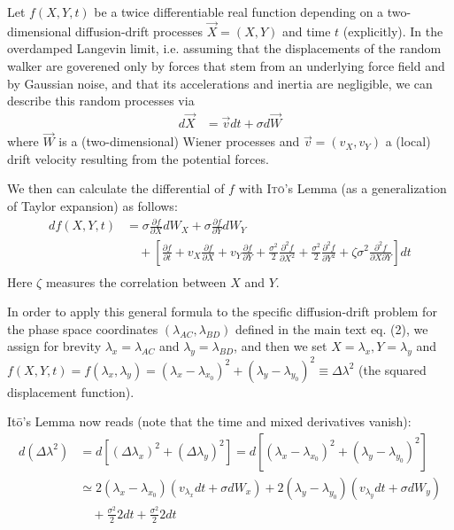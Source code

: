 \documentclass[10pt]{article}
\newcommand{\vekA}[1]{\vec{#1}}
\newcommand{\nn}{\nonumber}
\begin{document}
Let $f(X,Y,t)$ be a twice differentiable real function depending on a two-dimensional diffusion-drift processes $\vekA X=(X,Y)$ and time $t$ (explicitly).
In the overdamped Langevin limit, i.e. assuming that the displacements of the random walker are goverened only
by forces that stem from an underlying force field and by Gaussian noise, and that its accelerations and inertia are negligible,
we can describe this random processes via
\begin{align}
d\vekA X & = \vekA v dt + \sigma d\vekA W
\end{align}
where $\vekA W$ is a (two-dimensional) Wiener processes and $\vekA v = (v_X, v_Y)$ a (local) drift velocity resulting from the potential forces.

\pagebreak
\noindent We then can calculate the differential of $f$ with \textsc{It\={o}}'s Lemma (as a generalization of Taylor expansion) as follows:
\newcommand{\pder}[2]{\frac{\partial #1}{\partial #2}}
\newcommand{\pderII}[2]{\frac{\partial^2 #1}{\partial #2^2}}
\begin{align}
 df(X,Y,t) & = \sigma \pder{f}{X} dW_X + \sigma \pder{f}{Y} dW_Y  \nn\\
	   & \quad + \left[ \pder{f}{t} + v_X \pder{f}{X} + v_Y \pder{f}{Y}
			    + \frac{\sigma^2}{2}\pderII{f}{X} + \frac{\sigma^2}{2}\pderII{f}{Y} 
			    + \zeta \sigma^2 \frac{\partial^2 f}{\partial X \partial Y} \right] dt	\nn\\
\end{align}
Here $\zeta$ measures the correlation between $X$ and $Y$.

In order to apply this general formula to the specific diffusion-drift problem for the phase space coordinates $(\lambda_{AC}, \lambda_{BD})$ defined in the main text eq. (2), we assign for brevity $\lambda_x = \lambda_{AC}$ and $\lambda_y = \lambda_{BD}$, and then
we set $X=\lambda_x, Y=\lambda_y$ and $f(X,Y,t)=f(\lambda_x,\lambda_y)=(\lambda_x-\lambda_{x_0})^2 + (\lambda_y-\lambda_{y_0})^2 \equiv \Delta\lambda^2$
(the squared displacement function).

It\={o}'s Lemma now reads (note that the time and mixed derivatives vanish):
\begin{align}
 d (\Delta\lambda^2) &= d \left[ (\Delta\lambda_x)^2 + (\Delta\lambda_y)^2 \right] = d \left[ (\lambda_x-\lambda_{x_0})^2 + (\lambda_y-\lambda_{y_0})^2 \right] \nn\\
		     &\simeq 2(\lambda_x-\lambda_{x_0}) (v_{\lambda_x} dt + \sigma dW_x) + 2(\lambda_y-\lambda_{y_0}) (v_{\lambda_y} dt + \sigma dW_y) \nn\\
		     & \quad + \frac{\sigma^2}{2} 2 dt + \frac{\sigma^2}{2} 2 dt
\end{align}
\end{document}
